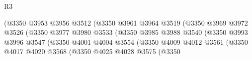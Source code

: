 \begin{lexlean}{R3}
\begin{coremodule}
                                                (@3350
                                                  @3953
                                                  @3956
                                                  @3512
                                                  (@3350
                                                    @3961
                                                    @3964
                                                    @3519
                                                    (@3350
                                                      @3969
                                                      @3972
                                                      @3526
                                                      (@3350
                                                        @3977
                                                        @3980
                                                        @3533
                                                        (@3350
                                                          @3985
                                                          @3988
                                                          @3540
                                                          (@3350
                                                            @3993
                                                            @3996
                                                            @3547
                                                            (@3350
                                                              @4001
                                                              @4004
                                                              @3554
                                                              (@3350
                                                                @4009
                                                                @4012
                                                                @3561
                                                                (@3350
                                                                  @4017
                                                                  @4020
                                                                  @3568
                                                                  (@3350
                                                                    @4025
                                                                    @4028
                                                                    @3575
                                                                    (@3350

\end{coremodule}
\end{lexlean}

